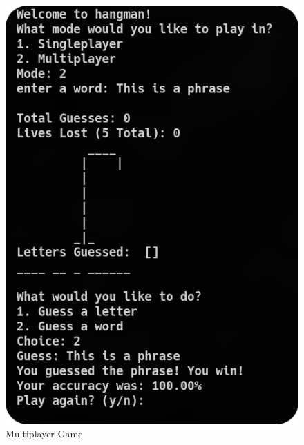 \documentclass[
	letterpaper, %
	10pt, %
]{CSUniSchoolLabReport}
\begin{document}
  \begin{figure}[H]
    \centering
    \includegraphics[width=.6\textwidth]{Figures/multiplayer.png}
    \caption{Multiplayer Game}
    \label{fig:4}
  \end{figure}
\end{document}
